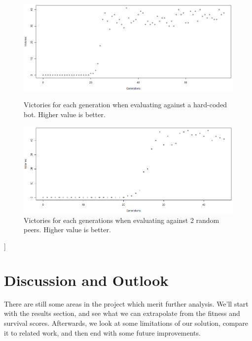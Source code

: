 \documentclass[a4paper, twocolumn]{article}
\begin{document}
{        \vspace{2em}
        \begin{figure}[H]
            \centering
            \begin{minipage}{\textwidth}  
                \includegraphics[width=\textwidth]{share/result-victories-against-bot.png}
                \caption{Victories for each generation when evaluating against a hard-coded bot. Higher value is better.}
                \label{fig:victory-against-bot}
            \end{minipage}
            \begin{minipage}{\textwidth}  
                \includegraphics[width=\textwidth]{share/result-victories-random.png}
                \caption{Victories for each generations when evaluating against 2 random peers. Higher value is better.}
                \label{fig:victory-against-random}
            \end{minipage}
        \end{figure}

        }]

        \clearpage

    \section{Discussion and Outlook} \label{sec:discussion_and_outlook}

    There are still some areas in the project which merit further analysis. We'll start with the results section, and see what we can extrapolate from the fitness and survival scores. Afterwards, we look at some limitations of our solution, compare it to related work, and then end with some future improvements.
\end{document}
